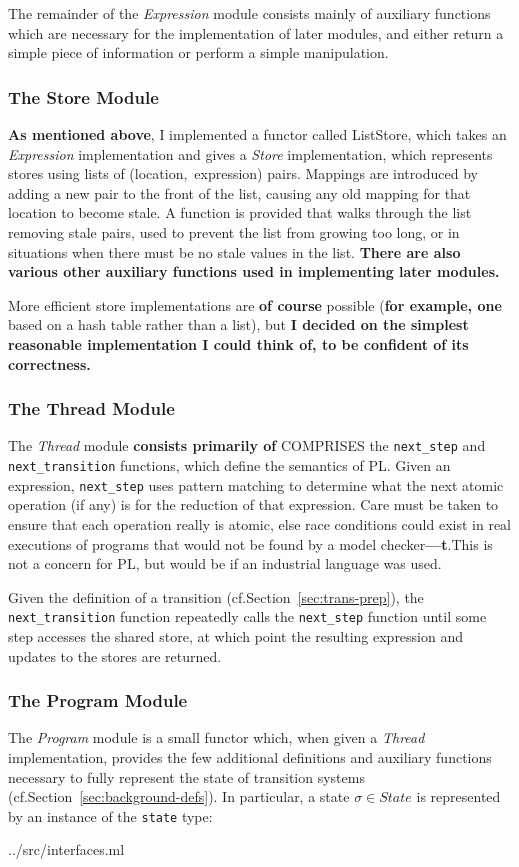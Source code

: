 \documentclass[12pt,a4paper,twoside,openright]{report}
\begin{document}
The remainder of the \emph{Expression} module
consists mainly of auxiliary functions which are
necessary for the implementation of later
modules, and either return a simple piece
of information or perform a simple manipulation.

\subsubsection{The Store Module}
\textbf{As mentioned above}, I implemented a functor
called ListStore, which takes an
\emph{Expression} implementation and
gives a \emph{Store} implementation, which
represents stores using lists of
(location,~expression) pairs. Mappings
are introduced by adding a new pair to
the front of the list, causing any old
mapping for that location to become stale.
A function is provided that walks through
the list removing stale pairs, used to
prevent the list from growing too long,
or in situations when there must be
no stale values in the list.
\textbf{There are also various other auxiliary functions
used in implementing later modules.}

More efficient store implementations are \textbf{of
course} possible (\textbf{for example, one} based on
a hash table rather than a list), but
\textbf{I decided on the simplest reasonable
implementation I could think of, to
be confident of its correctness.}

\subsubsection{The Thread Module}
The \emph{Thread} module \textbf{consists primarily of} COMPRISES
the \texttt{next\_step} and \texttt{next\_transition}
functions, which define the semantics of PL.
Given an expression, \texttt{next\_step} uses pattern
matching to determine what the next atomic
operation (if any) is for the reduction
of that expression.
Care must be taken to
ensure that each operation really is
atomic, else race conditions could exist
in real executions of programs that would
not be found by a model checker\textbf{---t}.This
is not a concern for PL, but would be if
an industrial language was used.

Given the definition
of a transition (cf.\@ Section~\ref{sec:trans-prep}),
the \texttt{next\_transition}
function repeatedly calls the \texttt{next\_step}
function until some step accesses the shared
store, at which point the resulting expression
and updates to the stores are returned.

\subsubsection{The Program Module}
The \emph{Program} module is a small functor which,
when given a \emph{Thread} implementation, provides 
the few additional definitions and auxiliary
functions necessary to fully represent the state of
transition systems (cf.\@ Section~\ref{sec:background-defs}).
In particular, a state $\sigma \in \textit{State}$ is
represented by an instance of the \texttt{state} type:

	{../src/interfaces.ml}
\end{document}
